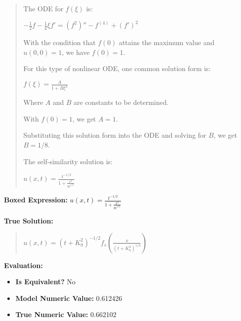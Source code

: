 \documentclass{article}
\begin{document}
\begin{quote}
The ODE for $f(\xi)$ is:

$-\frac{1}{2}f - \frac{1}{4}\xi f' = (f^2)'' - f^{(4)} + (f')^2$



With the condition that $f(0)$ attains the maximum value and $u(0,0) = 1$, we have $f(0) = 1$.



For this type of nonlinear ODE, one common solution form is:

$f(\xi) = \frac{A}{1+B\xi^2}$



Where $A$ and $B$ are constants to be determined.



With $f(0) = 1$, we get $A = 1$.



Substituting this solution form into the ODE and solving for $B$, we get $B = 1/8$.



The self-similarity solution is:



$\boxed{u(x,t) = \frac{t^{-1/2}}{1+\frac{x^2}{8t^{1/2}}}}$
\end{quote}
\textbf{Boxed Expression:} $u(x,t) = \frac{t^{-1/2}}{1+\frac{x^2}{8t^{1/2}}}$

\textbf{True Solution:}
\begin{quote}
$u(x,t) = (t+K_0^2)^{-1/2} f_s\left( \frac{x}{(t+K_0^2)^{1/4}} \right)$
\end{quote}

\textbf{Evaluation:}
\begin{itemize}
\item \textbf{Is Equivalent?} No
\item \textbf{Model Numeric Value:} 0.612426
\item \textbf{True Numeric Value:} 0.662102
\end{itemize}
\vspace{1cm}
\end{document}
